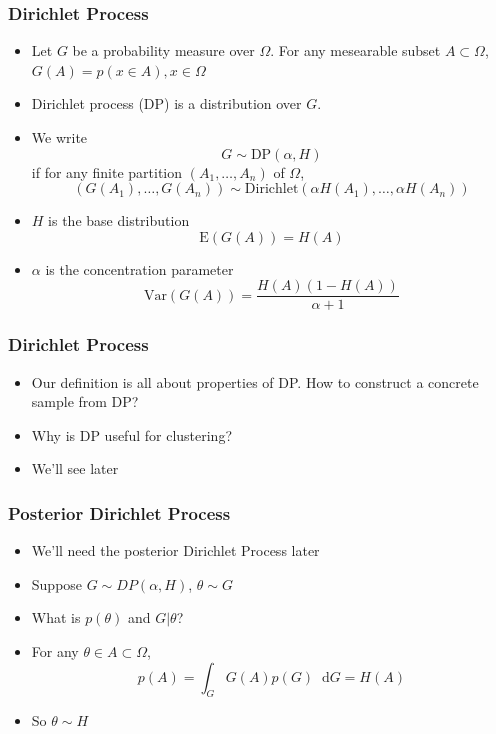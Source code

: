 \documentclass{beamer}
\newcommand*\diff{\mathop{}\!\mathrm{d}}
\begin{document}
\begin{frame}
	\frametitle{Dirichlet Process}
	\begin{itemize}
		\item Let $G$ be a probability measure over $\Omega$. For any mesearable subset $A\subset \Omega$, $G(A)=p(x\in A), x\in \Omega$
		\item Dirichlet process (DP) is a distribution over $G$. 
		\item We write 
		\[
			G \sim \text{DP}(\alpha, H)
		\]
		if for any finite partition $(A_1, \ldots, A_n)$ of $\Omega$,
		\[
			(G(A_1), \ldots, G(A_n)) \sim \text{Dirichlet}(\alpha H(A_1), \ldots, \alpha H(A_n))
		\]
		\item $H$ is the {\color{red} base distribution}
		\[
		\text{E}(G(A)) = H(A)
		\]
		\item $\alpha$ is the {\color{red} concentration parameter}
		\[
		\text{Var}(G(A)) = \frac{H(A)(1-H(A))}{\alpha+1}
		\]
	\end{itemize}
\end{frame}

\begin{frame}
	\frametitle{Dirichlet Process}
	\begin{itemize}
		\item{Our definition is all about properties of DP. How to construct a concrete sample from DP?}
		\item{Why is DP useful for clustering?}
		\item{We'll see later}
	\end{itemize}
\end{frame}

\begin{frame}
	\frametitle{Posterior Dirichlet Process}
	\begin{itemize}
		\item We'll need the posterior Dirichlet Process later
		\item Suppose $G \sim DP(\alpha, H)$, $\theta \sim G$
		\item What is $p(\theta)$ and $G|\theta$?
		\pause
		\item For any $\theta \in A \subset \Omega$, \[
			p(A)=\int_G G(A)p(G)\diff G = H(A)
		\]
		\item So $\theta \sim H$
		
	\end{itemize}
\end{frame}
\end{document}
